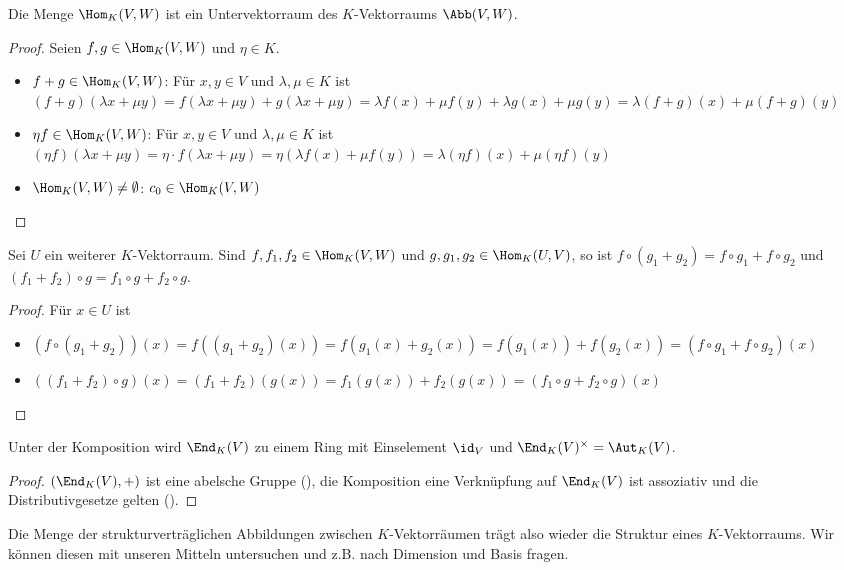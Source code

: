 \begin{proposition}
	Die Menge $\Hom_K(V,W)$ ist ein Untervektorraum des $K$-Vektorraums $\Abb(V,W)$.
\end{proposition}
\begin{proof}
	Seien $f,g\in \Hom_K(V,W)$ und $\eta \in K$.
	\begin{itemize}
		\item $f+g\in \Hom_K(V,W)$: Für $x,y\in V$ und $\lambda,\mu\in K$ ist $(f+g)(\lambda x+\mu y)=f(\lambda x+\mu y)+
		g(\lambda x+\mu y)=\lambda f(x)+\mu f(y)+\lambda g(x)+\mu g(y)=\lambda(f+g)(x)+\mu(f+g)(y)$
		\item $\eta f\in \Hom_K(V,W)$: Für $x,y\in V$ und $\lambda,\mu\in K$ ist $(\eta f)(\lambda x+\mu y)=\eta\cdot 
		f(\lambda x+\mu y)=\eta(\lambda f(x)+\mu f(y))=\lambda(\eta f)(x)+\mu(\eta f)(y)$
		\item $\Hom_K(V,W)\neq\emptyset$: $c_0\in \Hom_K(V,W)$
	\end{itemize}
\end{proof}

\begin{lemma}
	Sei $U$ ein weiterer $K$-Vektorraum. Sind $f,f_1,f_2\in \Hom_K(V,W)$ und $g,g_1,g_2\in \Hom_K(U,V)$, so ist 
	$f\circ (g_1+g_2)=f\circ g_1+f\circ g_2$ und $(f_1+f_2)\circ g=f_1\circ g+f_2\circ g$.
\end{lemma}
\begin{proof}
	Für $x\in U$ ist
	\begin{itemize}
		\item $(f\circ(g_1+g_2))(x)=f((g_1+g_2)(x))=f(g_1(x)+g_2(x))=f(g_1(x))+f(g_2(x))=(f\circ g_1+f\circ g_2)(x)$
		\item $((f_1+f_2)\circ g)(x)=(f_1+f_2)(g(x))=f_1(g(x))+f_2(g(x))=(f_1\circ g+f_2\circ g)(x)$
	\end{itemize}
\end{proof}

\begin{conclusion}
	Unter der Komposition wird $\End_K(V)$ zu einem Ring mit Einselement $\id_V$ und $\End_K(V)^{\times}=
	\Aut_K(V)$.
\end{conclusion}
\begin{proof}
	$(\End_K(V),+)$ ist eine abelsche Gruppe (), die Komposition eine Verknüpfung auf $\End_K(V)$ ist assoziativ und die 
	Distributivgesetze gelten ().
\end{proof}

\begin{remark}
	Die Menge der strukturverträglichen Abbildungen zwischen $K$-Vektorräumen trägt also wieder die Struktur 
	eines $K$-Vektorraums. Wir können diesen mit unseren Mitteln untersuchen und z.B. nach Dimension und Basis fragen.
\end{remark}

